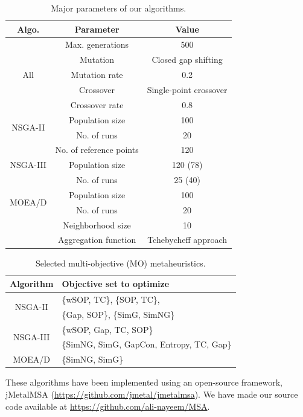 \begin{table}[!htbp]
	\centering
	\small
	\caption{Major parameters of our algorithms.}
	\begin{tabular}{|c|c|c|} %
		\hline
		Algo. & \multicolumn{1}{c|}{Parameter} & Value \\
		\hline
		\multirow{5}{*}{All} & Max. generations & 500 \\
		
		\cline{2-3}          & Mutation  & Closed gap shifting \\
		\cline{2-3}          & Mutation rate & 0.2 \\
		\cline{2-3}          & Crossover  & Single-point crossover \\
		\cline{2-3}          & Crossover rate & 0.8 \\ %
		\hline
		\multirow{2}{*}{NSGA-II} & Population size & 100 \\ %
		\cline{2-3}          & No. of runs & 20 \\
		\hline
		\multirow{3}{*}{NSGA-III} & No. of reference points & 120 \\
		\cline{2-3}          & Population size & 120 (78) \\ %
		\cline{2-3}          & No. of runs & 25 (40) \\
		\hline
		\multirow{2}{*}{MOEA/D} & Population size & 100 \\ %
		\cline{2-3}          & No. of runs & 20 \\
		\cline{2-3}          & Neighborhood size & 10 \\
		\cline{2-3}          & Aggregation function & Tchebycheff approach \\
		\hline
	\end{tabular}%
	\label{tab:cyb-parameters}%
\end{table}%

\begin{table}[!htbp]
\centering
	\caption{Selected multi-objective (MO) metaheuristics.}
	\begin{tabular}{|c|l|} \hline
		Algorithm & Objective set to optimize \\
		\hline
		\multicolumn{1}{|c|}{\multirow{2}{*}{NSGA-II}} & \{wSOP, TC\}, 
		\{SOP, TC\},          \\
		& \{Gap, SOP\},
		\{SimG, SimNG\} \\
		\hline
		\multicolumn{1}{|c|}{\multirow{2}{*}{NSGA-III}} & \{wSOP, Gap, TC, SOP\} \\
		& \{SimNG, SimG, GapCon, Entropy, TC, Gap\} \\
		\hline
		\multicolumn{1}{|c|}{\multirow{1}{*}{MOEA/D}} & \{SimNG, SimG\}\\
		\hline
	\end{tabular}\label{tab:variants}\end{table}These algorithms have been implemented using an open-source framework, jMetalMSA (\url{https://github.com/jmetal/jmetalmsa}). We have made our source code available at \url{https://github.com/ali-nayeem/MSA}.

